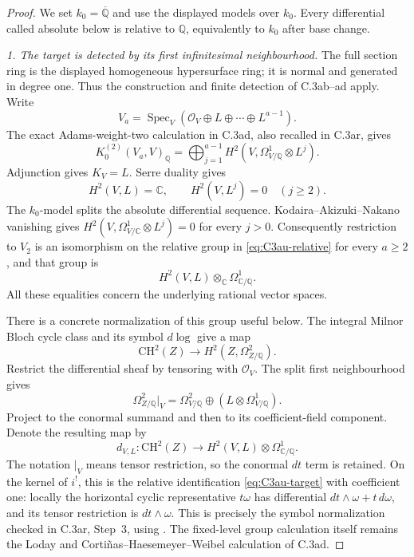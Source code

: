 \begin{proof}
We set $k_0=\overline{\mathbb Q}$ and use the displayed models
over $k_0$. Every differential called absolute below is relative
to $\mathbb Q$, equivalently to $k_0$ after base change.

\emph{1. The target is detected by its first infinitesimal neighbourhood.}
The full section ring is the displayed homogeneous hypersurface ring;
it is normal and generated in degree one. Thus the construction and
finite detection of C.3ab--ad apply. Write
\[
 V_a=\operatorname{Spec}_V
       (\mathcal O_V\oplus L\oplus\cdots\oplus L^{a-1}).
\]
The exact Adams-weight-two calculation in C.3ad, also recalled in
C.3ar, gives
\begin{equation}\label{eq:C3au-relative}
 K_0^{(2)}(V_a,V)_{\mathbb Q}
   =\bigoplus_{j=1}^{a-1}
       H^2(V,\Omega^1_{V/\mathbb Q}\otimes L^j).
\end{equation}
Adjunction gives $K_V=L$. Serre duality gives
\[
 H^2(V,L)=\mathbb C,
 \qquad H^2(V,L^j)=0\quad(j\ge2).
\]
The $k_0$-model splits the absolute differential sequence.
Kodaira--Akizuki--Nakano vanishing gives
$H^2(V,\Omega^1_{V/\mathbb C}\otimes L^j)=0$ for every $j>0$.
Consequently restriction to $V_2$ is an isomorphism on the
relative group in \eqref{eq:C3au-relative} for every $a\ge2$, and
that group is
\begin{equation}\label{eq:C3au-target}
       H^2(V,L)\otimes_{\mathbb C}\Omega^1_{\mathbb C/\mathbb Q}.
\end{equation}
All these equalities concern the underlying rational vector spaces.

There is a concrete normalization of this group useful below.
The integral Milnor Bloch cycle class and its symbol $d\log$
give a map
\[
 \mathrm{CH}^2(Z)\longrightarrow
                  H^2(Z,\Omega^2_{Z/\mathbb Q}).
\]
Restrict the differential sheaf by tensoring with $\mathcal O_V$.
The split first neighbourhood gives
\[
 \Omega^2_{Z/\mathbb Q}|_V
    =\Omega^2_{V/\mathbb Q}
          \oplus (L\otimes\Omega^1_{V/\mathbb Q}).
\]
Project to the conormal summand and then to its coefficient-field
component. Denote the resulting map by
\[
 d_{V,L}:\mathrm{CH}^2(Z)\longrightarrow
               H^2(V,L)\otimes\Omega^1_{\mathbb C/\mathbb Q}.
\]
The notation $|_V$ means tensor restriction, so the conormal
$dt$ term is retained. On the kernel of $i^!$, this is the
relative identification \eqref{eq:C3au-target} with coefficient
one: locally the horizontal cyclic representative $t\omega$
has differential $dt\wedge\omega+t\,d\omega$, and its tensor
restriction is $dt\wedge\omega$. This is precisely the symbol
normalization checked in C.3ar, Step~3, using
\citet[Lemma 2.2, Proposition 2.3 and the proof of Proposition 6.1]{D_BlochEsnaultKerz2014}.
The fixed-level group calculation itself remains the Loday and
Corti\~nas--Haesemeyer--Weibel calculation of C.3ad.


\end{proof}
